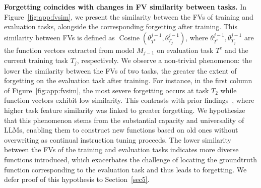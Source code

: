 \textbf{Forgetting coincides with changes in  FV similarity between tasks.} 
In Figure~\ref{fig:app:fvsim}, we present the similarity between the FVs of training and evaluation tasks, alongside the corresponding forgetting after training. This similarity between FVs is defined as $\operatorname{Cosine}(\theta_{T^e}^{j-1}, \theta_{T_j}^{j-1})$, where $\theta_{T^e}^{j-1}, \theta_{T_j}^{j-1}$ are the function vectors extracted from model $M_{j-1}$ on evaluation task $T^e$ and the current training task $T_j$, respectively. 
We observe a non-trivial phenomenon: the lower the similarity between the FVs of two tasks, the greater the extent of forgetting on the evaluation task after training. For instance, in the first column of Figure~\ref{fig:app:fvsim}, the most severe forgetting occurs at task $T_2$ while function vectors exhibit low similarity. This contrasts with prior findings~\citep{ramasesh2020anatomy, lee2021continual}, where higher task feature similarity was linked to greater forgetting. 
We hypothesize that this phenomenon stems from the substantial capacity and universality of LLMs, enabling them to construct new functions based on old ones without overwriting as continual instruction tuning proceeds. The lower similarity between the FVs of the training and evaluation tasks indicates more diverse functions introduced, which exacerbates the challenge of locating the groundtruth function corresponding to the evaluation task and thus leads to forgetting.
We defer proof of this hypothesis to Section~\ref{sec5}.








